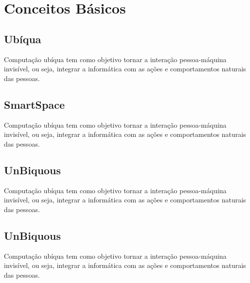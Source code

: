 \textual

\chapter{Conceitos Básicos}
	
	\section{Ubíqua}
	
		Computação ubíqua tem como objetivo tornar a interação pessoa-máquina invisível, ou seja, integrar a informática com as ações e comportamentos naturais das pessoas.
	
	\section{SmartSpace}
	
		Computação ubíqua tem como objetivo tornar a interação pessoa-máquina invisível, ou seja, integrar a informática com as ações e comportamentos naturais das pessoas.
	
	\section{UnBiquous}
	
		Computação ubíqua tem como objetivo tornar a interação pessoa-máquina invisível, ou seja, integrar a informática com as ações e comportamentos naturais das pessoas.

	\section{UnBiquous}
	
		Computação ubíqua tem como objetivo tornar a interação pessoa-máquina invisível, ou seja, integrar a informática com as ações e comportamentos naturais das pessoas.